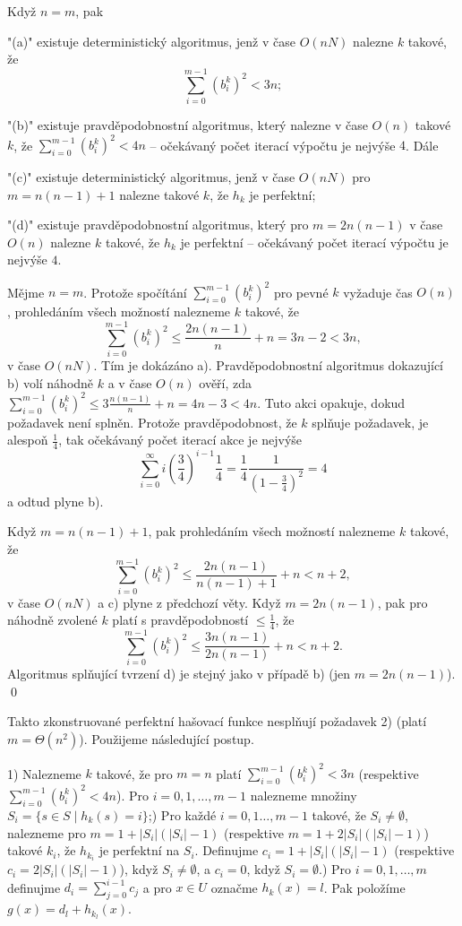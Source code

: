 \documentclass[a4paper,12pt]{article}
\begin{document}
Když $n=m$, pak 
\roster
\item"{(a)}"
existuje deterministický algoritmus, jenž v čase $O(nN)$ 
nalezne $k$ takové, že 
$$\sum_{i=0}^{m-1}(b_i^k)^2<3n;$$
\item"{(b)}"
existuje pravděpodobnostní algoritmus, který 
nalezne v čase $O(n)$ takové $k$, že $\sum_{i=0}^{m-1}(b_
i^k)^2<4n$ -- očekávaný počet iterací výpočtu je nejvýše $
4$.
\endroster
Dále 
\roster
\item"{(c)}"
existuje deterministický algoritmus, jenž v čase $O(nN)$ pro 
$m=n(n-1)+1$ nalezne takové $k$, že $h_k$ je 
perfektní;
\item"{(d)}"
existuje pravděpodobnostní algoritmus, který pro 
$m=2n(n-1)$ v čase $O(n)$ nalezne $k$ takové, že $h_k$ je 
perfektní -- očekávaný počet iterací výpočtu 
je nejvýše $4$.
\endroster
\endproclaim

Mějme $n=m$. Protože spočítání 
$\sum_{i=0}^{m-1}(b_i^k)^2$ pro pevné $k$ vyžaduje čas $O
(n)$, prohledáním 
všech možností nalez\-ne\-me $k$ takové, že 
$$\sum_{i=0}^{m-1}(b_i^k)^2\le\frac {2n(n-1)}n+n=3n-2<3n,$$
v čase $O(nN)$. Tím je 
dokázáno a). Pravděpodobnostní algoritmus dokazující b) volí 
náhodně $k$ a v čase $O(n)$ ověří, zda 
$\sum_{i=0}^{m-1}(b_i^k)^2\le 3\frac {n(n-1)}n+n=4n-3<4n$. Tuto akci opakuje, dokud 
požadavek není splněn. Protože pravděpodobnost, že $
k$ splňuje 
požadavek, je alespoň $\frac 14$, tak očekávaný počet ite\-rací 
akce je nejvýše 
$$\sum_{i=0}^{\infty}i(\frac 34)^{i-1}\frac 14=\frac 14\frac 1{(1
-\frac 34)^2}=4$$
a odtud plyne b). 

Když $m=n(n-1)+1$, pak prohledáním všech možností 
nalezne\-me $k$ takové, že 
$$\sum_{i=0}^{m-1}(b_i^k)^2\le\frac {2n(n-1)}{n(n-1)+1}+n<n+2,$$
 v 
čase $O(nN)$ a c) plyne z předchozí věty. Když 
$m=2n(n-1)$, pak pro náhodně zvolené $k$ platí s 
pravděpodobností $\le\frac 14$, že 
$$\sum_{i=0}^{m-1}(b_i^k)^2\le\frac {3n(n-1)}{2n(n-1)}+n<n+2.$$
Algoritmus splňující tvrzení d) je stejný jako 
v případě b) (jen $m=2n(n-1)$). \qed
\enddemo

Takto zkonstruované perfektní hašovací funkce 
nesplňují poža\-davek 2) (platí $m=\Theta (n^2)$).  Použijeme následující 
postup. 

1) Nalezneme $k$ takové, že pro $m=n$ platí 
$\sum_{i=0}^{m-1}(b_i^k)^2<3n$ (respektive $\sum_{i=0}^{m-1}(b_i^
k)^2<4n$).  Pro 
$i=0,1,\dots,m-1$ nalezneme množiny 
$S_i=\{s\in S\mid h_k(s)=i\}$;) Pro každé $i=0,1\dots,m-1$ takové, že $S_i\ne\emptyset$, 
nalezneme pro $m=1+|S_i|(|S_i|-1)$ (respektive $m=1+2|S_i|(|S_i|-
1)$) 
takové $k_i$, že $h_{k_i}$ je perfektní na $S_i$. Definujme 
$c_i=1+|S_i|(|S_i|-1)$ (respektive $c_i=2|S_i|(|S_i|-1)$), když 
$S_i\ne\emptyset$, a $c_i=0$, když 
$S_i=\emptyset$.) Pro $i=0,1,\dots,m$ definujme $d_i=\sum_{j=0}^{i-1}c_j$ a pro $
x\in U$ 
označme $h_k(x)=l$. Pak položíme $g(x)=d_l+h_{k_l}(x)$.
\end{document}
